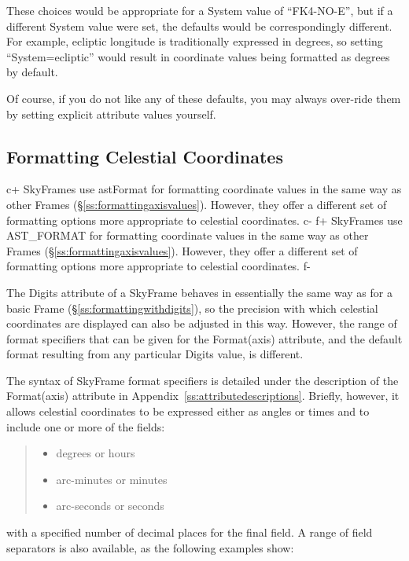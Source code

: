\documentclass[twoside,11pt]{article}
\newcommand{\appref}[1]{Appendix~\ref{#1}}
\newcommand{\secref}[1]{\S\ref{#1}}
\newcommand{\appref}[1]{\ref{#1}}
\newcommand{\secref}[1]{\ref{#1}}
\begin{document}
These choices would be appropriate for a System value of ``FK4-NO-E'',
but if a different System value were set, the defaults would be
correspondingly different. For example, ecliptic longitude is
traditionally expressed in degrees, so setting ``System=ecliptic''
would result in coordinate values being formatted as degrees by
default.

Of course, if you do not like any of these defaults, you may always
over-ride them by setting explicit attribute values yourself.

\subsection{\label{ss:formattingskyaxisvalues}Formatting Celestial Coordinates}

c+
SkyFrames use astFormat for formatting coordinate values in the same
way as other Frames (\secref{ss:formattingaxisvalues}). However, they
offer a different set of formatting options more appropriate to
celestial coordinates.
c-
f+
SkyFrames use AST\_FORMAT for formatting coordinate values in the same
way as other Frames (\secref{ss:formattingaxisvalues}). However, they
offer a different set of formatting options more appropriate to
celestial coordinates.
f-

The Digits attribute of a SkyFrame behaves in essentially the same way
as for a basic Frame (\secref{ss:formattingwithdigits}), so the
precision with which celestial coordinates are displayed can also be
adjusted in this way. However, the range of format specifiers that can
be given for the Format(axis) attribute, and the default format
resulting from any particular Digits value, is different.

The syntax of SkyFrame format specifiers is detailed under the
description of the Format(axis) attribute in
\appref{ss:attributedescriptions}.  Briefly, however, it allows
celestial coordinates to be expressed either as angles or times and to
include one or more of the fields:

\begin{quote}
\begin{itemize}
\item degrees or hours
\item arc-minutes or minutes
\item arc-seconds or seconds
\end{itemize}
\end{quote}

with a specified number of decimal places for the final field. A range
of field separators is also available, as the following examples show:
\end{document}
